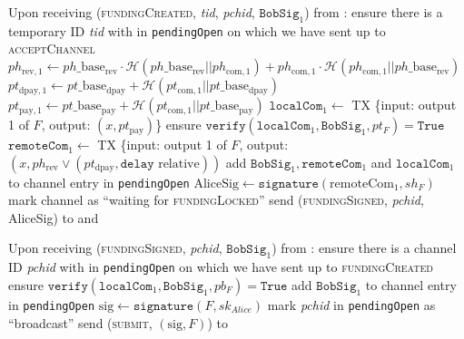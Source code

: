 \begin{algorithmic}[1]
    \State Upon receiving (\textsc{fundingCreated}, \textit{tid},
    \textit{pchid}, $\mathtt{BobSig}_1$) from \bob:
    \Indent
      \State ensure there is a temporary ID \textit{tid} with \bob{} in
      \texttt{pendingOpen} on which we have sent up to \textsc{acceptChannel}
      \State $ph_{\mathrm{rev}, 1} \gets ph\_\mathrm{base}_{\mathrm{rev}} \cdot
      \mathcal{H}\left(ph\_\mathrm{base}_{\mathrm{rev}} ||
      ph_{\mathrm{com}, 1}\right) + ph_{\mathrm{com}, 1} \cdot \mathcal{H}\left(
      ph_{\mathrm{com}, 1} || ph\_\mathrm{base}_{\mathrm{rev}}\right)$
      \State $pt_{\mathrm{dpay}, 1} \gets pt\_\mathrm{base}_{\mathrm{dpay}} +
      \mathcal{H}\left(pt_{\mathrm{com}, 1} ||
      pt\_\mathrm{base}_{\mathrm{dpay}}\right)$
      \State $pt_{\mathrm{pay}, 1} \gets pt\_\mathrm{base}_{\mathrm{pay}} +
      \mathcal{H}\left(pt_{\mathrm{com}, 1} ||
      pt\_\mathrm{base}_{\mathrm{pay}}\right)$
      \State $\mathtt{localCom}_1 \gets$ TX \{input: output 1 of $F$, output:
      $\left(x, pt_{\mathrm{pay}}\right)$\}
      \State ensure $\mathtt{verify}\left(\mathtt{localCom}_1,
      \mathtt{BobSig}_1, pt_F\right) = \mathtt{True}$
      \State $\mathtt{remoteCom}_1 \gets$ TX \{input: output 1 of $F$, output:
      $\left(x, ph_{\mathrm{rev}} \vee \left(pt_{\mathrm{dpay}}, \mathtt{delay}
      \text{ relative}\right)\right)$ 
      \State add $\mathtt{BobSig}_1, \mathtt{remoteCom}_1$ and
      $\mathtt{localCom}_1$ to channel entry in \texttt{pendingOpen}
      \State $\mathrm{AliceSig} \gets
      \mathtt{signature}\left(\mathrm{remoteCom}_1, sh_F\right)$
      \State mark channel as ``waiting for \textsc{fundingLocked}''
      \State send (\textsc{fundingSigned}, \textit{pchid}, AliceSig) to \bob{}
      and \adversary
    \EndIndent
    \State

    \State Upon receiving (\textsc{fundingSigned}, \textit{pchid},
    $\mathtt{BobSig}_1$) from \bob:
    \Indent
      \State ensure there is a channel ID \textit{pchid} with \bob{} in
      \texttt{pendingOpen} on which we have sent up to \textsc{fundingCreated}
      \State ensure $\mathtt{verify}\left(\mathtt{localCom}_1,
      \mathtt{BobSig}_1, pb_F\right) = \mathtt{True}$
      \State add $\mathtt{BobSig}_1$ to channel entry in \texttt{pendingOpen}
      \State $\mathrm{sig} \gets \mathtt{signature}\left(F,
      sk_{\mathit{Alice}}\right)$
      \State mark \textit{pchid} in \texttt{pendingOpen} as ``broadcast''
      \State send (\textsc{submit}, $\left(\mathrm{sig}, F\right)$) to \ledger
    \EndIndent
    \State


\end{algorithmic}
